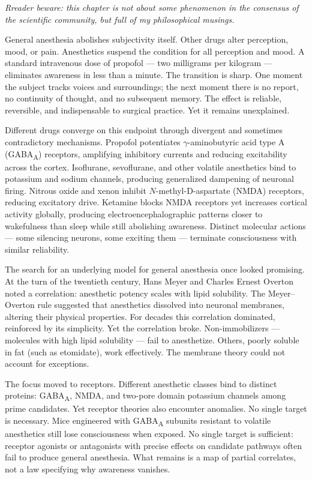 \textit{Rreader beware: this chapter is not about some phenomenon in the consensus of the scientific community, but full of my philosophical musings.}

General anesthesia abolishes subjectivity itself. Other drugs alter perception, mood, or pain. Anesthetics suspend the condition for all perception and mood. A standard intravenous dose of propofol — two milligrams per kilogram — eliminates awareness in less than a minute. The transition is sharp. One moment the subject tracks voices and surroundings; the next moment there is no report, no continuity of thought, and no subsequent memory. The effect is reliable, reversible, and indispensable to surgical practice. Yet it remains unexplained.

Different drugs converge on this endpoint through divergent and sometimes contradictory mechanisms. Propofol potentiates $\gamma$-aminobutyric acid type A (GABA\textsubscript{A}) receptors, amplifying inhibitory currents and reducing excitability across the cortex. Isoflurane, sevoflurane, and other volatile anesthetics bind to potassium and sodium channels, producing generalized dampening of neuronal firing. Nitrous oxide and xenon inhibit $N$-methyl-D-aspartate (NMDA) receptors, reducing excitatory drive. Ketamine blocks NMDA receptors yet increases cortical activity globally, producing electroencephalographic patterns closer to wakefulness than sleep while still abolishing awareness. Distinct molecular actions — some silencing neurons, some exciting them — terminate consciousness with similar reliability.

The search for an underlying model for general anesthesia once looked promising. At the turn of the twentieth century, Hans Meyer and Charles Ernest Overton noted a correlation: anesthetic potency scales with lipid solubility. The Meyer–Overton rule suggested that anesthetics dissolved into neuronal membranes, altering their physical properties. For decades this correlation dominated, reinforced by its simplicity. Yet the correlation broke. Non-immobilizers — molecules with high lipid solubility — fail to anesthetize. Others, poorly soluble in fat (such as etomidate), work effectively. The membrane theory could not account for exceptions.

The focus moved to receptors. Different anesthetic classes bind to distinct proteins: GABA\textsubscript{A}, NMDA, and two-pore domain potassium channels among prime candidates. Yet receptor theories also encounter anomalies. No single target is necessary. Mice engineered with GABA\textsubscript{A} subunits resistant to volatile anesthetics still lose consciousness when exposed. No single target is sufficient: receptor agonists or antagonists with precise effects on candidate pathways often fail to produce general anesthesia. What remains is a map of partial correlates, not a law specifying why awareness vanishes.

